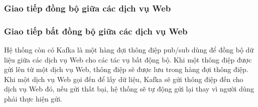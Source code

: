 \subsubsection{Giao tiếp đồng bộ giữa các dịch vụ Web}



\subsubsection{Giao tiếp bất đồng bộ giữa các dịch vụ Web}

Hệ thống còn có Kafka là một hàng đợi thông điệp pub/sub dùng để đồng bộ dữ liệu giữa các dịch vụ Web cho các tác vụ bất động bộ. Khi một thông điệp được gửi lên từ một dịch vụ Web, thông điệp sẽ được lưu trong hàng đợi thông điệp. Khi một dịch vụ Web gọi đến để lấy dữ liệu, Kafka sẽ gửi thông điệp đến cho dịch vụ Web đó, nếu gửi thất bại, hệ thống sẽ tự động gửi lại thay vì người dùng phải thực hiện gửi.

